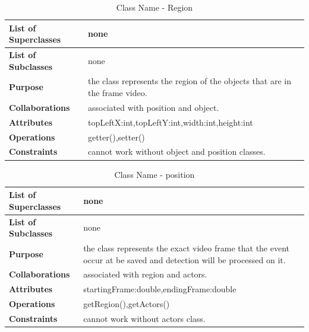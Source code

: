 \documentclass[12pt]{article}
\begin{document}
\begin{table}[h!]
\caption{Class Name - Region}
\label{tab:my-table}
\begin{tabular}{|p{}|p{}|}


 \hline
\textbf{List of Superclasses}  &    none                                               
\\ \hline
\textbf{List of Subclasses}    & none                                                                  
\\ \hline
\textbf{Purpose}               & the class represents the region of the objects that are in the frame video.                                                             
\\ \hline
\textbf{Collaborations}        & associated with position and object. 
\\ \hline
\textbf{Attributes}  & topLeftX:int,topLeftY:int,width:int,height:int
\\ \hline
\textbf{Operations} & getter(),setter()
\\ \hline
\textbf{Constraints} & cannot work without object and position classes.
\\ \hline
\end{tabular}
\end{table}

\begin{table}[h!]
\caption{Class Name - position}
\label{tab:my-table}
\begin{tabular}{|p{}|p{}|}


 \hline
\textbf{List of Superclasses}  &    none                                               
\\ \hline
\textbf{List of Subclasses}    & none                                                                  
\\ \hline
\textbf{Purpose}               & the class represents the exact video frame that the event occur at  be saved and detection will be processed on it.                                      
\\ \hline
\textbf{Collaborations}        & associated with region and actors. 
\\ \hline
\textbf{Attributes}  & startingFrame:double,endingFrame:double
\\ \hline
\textbf{Operations} & getRegion(),getActors()
\\ \hline
\textbf{Constraints} & cannot work without actors class.
\\ \hline
\end{tabular}
\end{table}
\end{document}
